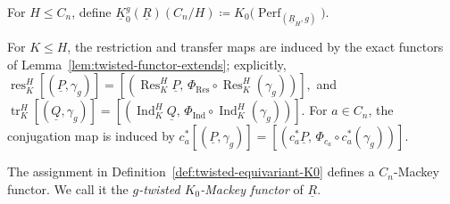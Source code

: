 \documentclass[11pt,oneside]{amsart}
\DeclareMathOperator{\res}{res}
\DeclareMathOperator{\tr}{tr}
\numberwithin{equation}{section}
\numberwithin{figure}{section}
\theoremstyle{plain}
\theoremstyle{definition}
\theoremstyle{remark}
\begin{document}
\begin{definition}\label{def:twisted-equivariant-K0}
For \(H\leq C_n\), define
\(
\underline K_0^g(\underline R)(C_n/H)
\coloneqq
K_0\bigl(\operatorname{Perf}_{(\underline R_H,g)}\bigr).
\)

For \(K\leq H\), the restriction and transfer maps are induced by the exact functors of Lemma~\ref{lem:twisted-functor-extends}; explicitly,
\(
\res_K^H[(\underline P,\gamma_{g})]
=
\left[
\left(
\operatorname{Res}_K^H\underline P,\,
\Phi_{\operatorname{Res}}\circ
\operatorname{Res}_K^H(\gamma_{g})
\right)
\right],
\)
and
\(
\tr_K^H[(\underline Q,\gamma_{g})]
=
\left[
\left(
\operatorname{Ind}_K^H\underline Q,\,
\Phi_{\operatorname{Ind}}\circ
\operatorname{Ind}_K^H(\gamma_{g})
\right)
\right].
\)
For \(a\in C_n\), the conjugation map is induced by
\(
c_a^*[(\underline P,\gamma_{g})]
=
\left[
\left(
c_a^*\underline P,\,
\Phi_{c_a}\circ c_a^*(\gamma_{g})
\right)
\right].
\)
\end{definition}

\begin{prop}\label{prop:twisted-K0-Mackey}
The assignment in Definition~\ref{def:twisted-equivariant-K0} defines a
\(C_n\)-Mackey functor. We call it the \emph{\(g\)-twisted
\(K_0\)-Mackey functor} of \(\underline R\).
\end{prop}
\end{document}
